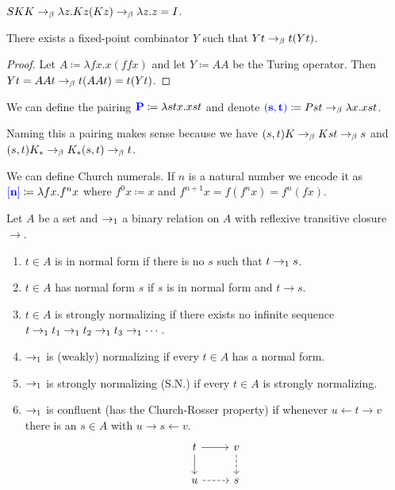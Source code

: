 \begin{example}
    $SKK \to_{\beta} \lambda z. Kz(Kz) \to_{\beta} \lambda z.z = I$.
\end{example}

\begin{boxprop} \label{prop:fixpoi}
    There exists a \alert{fixed-point combinator} $Y$ such that $Y t \to_{\beta} t(Yt)$.
\end{boxprop}
\begin{proof}
    Let $A \coloneq \lambda fx. x(ffx)$ and let $Y \coloneq AA$ be the \alert{Turing operator}.
    Then $Yt = AAt \to_{\beta} t (AAt) = t(Yt)$.
\end{proof}

\begin{boxdefi}
    We can define the \alert{pairing} $\alert{P} \coloneq \lambda stx.xst$ and denote $\alert{(s, t)} \coloneq Pst \bered \lambda x. xst$.
\end{boxdefi}

\begin{rem}
    Naming this a pairing makes sense because we have $(s, t) K \to_{\beta} Kst \to_{\beta} s$ and $(s, t) K_* \to_{\beta} K_*(s, t) \to_{\beta} t$.
\end{rem}

\begin{boxdefi}
    We can define \alert{Church numerals}.
    If $n$ is a natural number we encode it as $\alert{[n]} \coloneq \lambda fx. f^n x$ where $f^0 x \coloneq x$ and $f^{n+1} x = f(f^nx) = f^n(fx)$.
\end{boxdefi}

\begin{boxdefi}
    Let $A$ be a set and $\to_1$ a binary relation on $A$ with reflexive transitive closure $\to$.
    \begin{enumerate}
        \item $t \in A$ is \alert{in normal form} if there is no $s$ such that $t \to_1 s$.
        \item $t \in A$ \alert{has normal form $s$} if $s$ is in normal form and $t \to s$.
        \item $t \in A$ is \alert{strongly normalizing} if there exists no infinite sequence $t \to_1 t_1 \to_1 t_2 \to_1 t_3 \to_1 \cdots$.
        \item $\to_1$ is \alert{(weakly) normalizing} if every $t \in A$ has a normal form.
        \item $\to_1$ is \alert{strongly normalizing (S.N.)} if every $t \in A$ is strongly normalizing.
        \item {$\to_1$ is \alert{confluent} (has the \alert{Church-Rosser property}) if whenever $u \leftarrow t \to v$ there is an $s \in A$ with $u \to s \leftarrow v$.
            \begin{equation*}
            \begin{tikzcd}[ampersand replacement=\&]
                t \ar[r] \ar[d] \& v \ar[d, dashed] \\
                u \ar[r, dashed] \& s
            \end{tikzcd}
        \end{equation*}}
    \end{enumerate}
\end{boxdefi}

